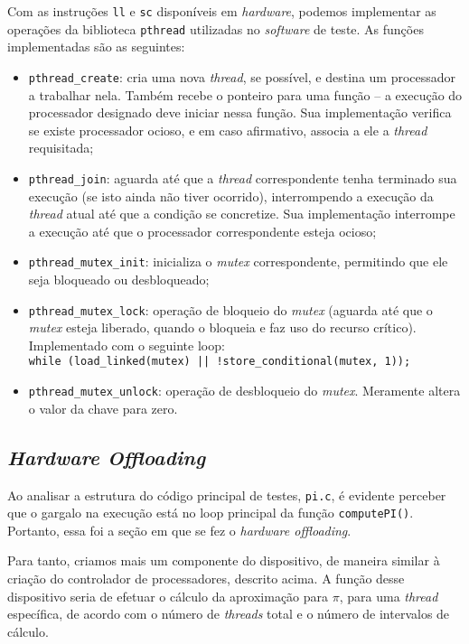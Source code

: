 \documentclass[11pt, a4paper]{article}
\begin{document}
Com as instruções \texttt{ll} e \texttt{sc} disponíveis em \textit{hardware}, podemos implementar as operações da biblioteca \texttt{pthread} utilizadas no \textit{software} de teste. As funções implementadas são as seguintes:
\begin{itemize}
\item \texttt{pthread\_create}: cria uma nova \textit{thread}, se possível, e destina um processador a trabalhar nela. Também recebe o ponteiro para uma função -- a execução do processador designado deve iniciar nessa função. Sua implementação verifica se existe processador ocioso, e em caso afirmativo, associa a ele a \textit{thread} requisitada;
\item \texttt{pthread\_join}: aguarda até que a \textit{thread} correspondente tenha terminado sua execução (se isto ainda não tiver ocorrido), interrompendo a execução da \textit{thread} atual até que a condição se concretize. Sua implementação interrompe a execução até que o processador correspondente esteja ocioso;
\item \texttt{pthread\_mutex\_init}: inicializa o \textit{mutex} correspondente, permitindo que ele seja bloqueado ou desbloqueado;
\item \texttt{pthread\_mutex\_lock}: operação de bloqueio do \textit{mutex} (aguarda até que o \textit{mutex} esteja liberado, quando o bloqueia e faz uso do recurso crítico). Implementado com o seguinte loop: \\ \texttt{while (load\_linked(mutex) || !store\_conditional(mutex, 1));}
\item \texttt{pthread\_mutex\_unlock}: operação de desbloqueio do \textit{mutex}. Meramente altera o valor da chave para zero.
\end{itemize}

\subsection{\textit{Hardware Offloading}}

Ao analisar a estrutura do código principal de testes, \texttt{pi.c}, é evidente perceber que o gargalo na execução está no loop principal da função \texttt{computePI()}. Portanto, essa foi a seção em que se fez o \textit{hardware offloading}.

Para tanto, criamos mais um componente do dispositivo, de maneira similar à criação do controlador de processadores, descrito acima. A função desse dispositivo seria de efetuar o cálculo da aproximação para $\pi$, para uma \textit{thread} específica, de acordo com o número de \textit{threads} total e o número de intervalos de cálculo. 
\end{document}
